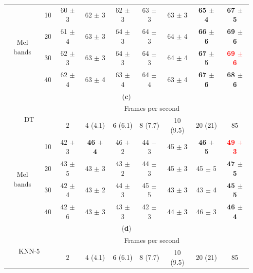 \documentclass[sensors,article,accept,moreauthors,pdftex,10pt,a4paper]{mdpi}
\begin{document}
\begin{table}[H]
\begin{tabular}{ccccccccc}
\multicolumn{1}{c}{\multirow{4}{*}{Mel bands}}
 & \multicolumn{1}{c}{10} & 60 $\pm$ 3 & 62 $\pm$ 3 & 62 $\pm$ 3 & 63 $\pm$ 3 & 63 $\pm$ 3 & \textbf{65 $\pm$ 4} & \textbf{67 $\pm$ 5} \\
\multicolumn{1}{c}{}
 & \multicolumn{1}{c}{20} & 61 $\pm$ 4 & 63 $\pm$ 3 & 64 $\pm$ 3 & 64 $\pm$ 3 & 64 $\pm$ 4 & \textbf{66 $\pm$ 6} & \textbf{69 $\pm$ 6} \\
\multicolumn{1}{c}{}
 & \multicolumn{1}{c}{30} & 62 $\pm$ 3 & 63 $\pm$ 3 & 64 $\pm$ 3 & 64 $\pm$ 3 & 64 $\pm$ 4 & \textbf{67 $\pm$ 5} & \textbf{\textcolor{red}{69 $\pm$ 6}} \\
\multicolumn{1}{c}{}
 & \multicolumn{1}{c}{40} & 62 $\pm$ 4 & 63 $\pm$ 4 & 63 $\pm$ 4 & 64 $\pm$ 4 & 63 $\pm$ 4 & \textbf{67 $\pm$ 6} & \textbf{68 $\pm$ 6} \\

\midrule

\multicolumn{9}{c}{(\textbf{c})}\\

\midrule

\multicolumn{2}{c}{\multirow{2}{*}{DT}} & \multicolumn{7}{c}{Frames per second}\\
\cmidrule{2-9}
 & & 2 & 4 (4.1) & 6 (6.1) & 8 (7.7) & 10 (9.5) & 20 (21) & 85 \\

\midrule

\multicolumn{1}{c}{\multirow{4}{*}{Mel bands}}
 & \multicolumn{1}{c}{10} & 42 $\pm$ 3 & \textbf{46 $\pm$ 4} & 46 $\pm$ 2 & 44 $\pm$ 3 & 45 $\pm$ 3 & \textbf{46 $\pm$ 5} & \textbf{\textcolor{red}{49 $\pm$ 3}} \\
\multicolumn{1}{c}{}
 & \multicolumn{1}{c}{20} & 43 $\pm$ 5 & 43 $\pm$ 3 & 43 $\pm$ 2 & 44 $\pm$ 3 & 45 $\pm$ 3 & 45 $\pm$ 5 & \textbf{47 $\pm$ 5} \\
\multicolumn{1}{c}{}
 & \multicolumn{1}{c}{30} & 42 $\pm$ 4 & 43 $\pm$ 2 & 44 $\pm$ 3 & 45 $\pm$ 5 & 43 $\pm$ 3 & 43 $\pm$ 4 & \textbf{45 $\pm$ 5} \\
\multicolumn{1}{c}{}
 & \multicolumn{1}{c}{40} & 42 $\pm$ 6 & 43 $\pm$ 3 & 43 $\pm$ 3 & 42 $\pm$ 3 & 44 $\pm$ 3 & 46 $\pm$ 3 & \textbf{46 $\pm$ 4} \\

\midrule

\multicolumn{9}{c}{(\textbf{d})}\\

\cmidrule{1-9}

\multicolumn{2}{c}{\multirow{2}{*}{KNN-5}} & \multicolumn{7}{c}{Frames per second}\\
\cmidrule{2-9}
 & & 2 & 4 (4.1) & 6 (6.1) & 8 (7.7) & 10 (9.5) & 20 (21) & 85 \\


\end{tabular}
\end{table}
\end{document}
